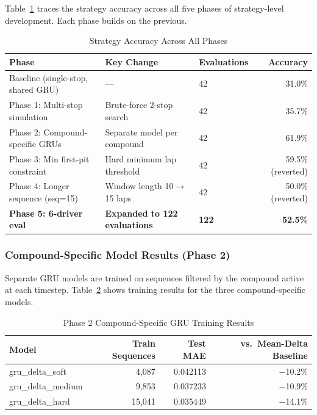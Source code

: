 \documentclass[12pt]{article}
\begin{document}
Table~\ref{tab:strategy} traces the strategy accuracy across all five phases of strategy-level development. Each phase builds on the previous.

\begin{table}[h]
\centering
\caption{Strategy Accuracy Across All Phases}
\label{tab:strategy}
\begin{tabular}{lllr}
\toprule
Phase & Key Change & Evaluations & Accuracy \\
\midrule
Baseline (single-stop, shared GRU) & — & 42 & 31.0\% \\
Phase 1: Multi-stop simulation & Brute-force 2-stop search & 42 & 35.7\% \\
Phase 2: Compound-specific GRUs & Separate model per compound & 42 & 61.9\% \\
Phase 3: Min first-pit constraint & Hard minimum lap threshold & 42 & 59.5\% (reverted) \\
Phase 4: Longer sequence (seq=15) & Window length 10$\to$15 laps & 42 & 50.0\% (reverted) \\
\textbf{Phase 5: 6-driver eval} & \textbf{Expanded to 122 evaluations} & \textbf{122} & \textbf{52.5\%} \\
\bottomrule
\end{tabular}
\end{table}

\subsubsection{Compound-Specific Model Results (Phase 2)}

Separate GRU models are trained on sequences filtered by the compound active at each timestep. Table~\ref{tab:compound} shows training results for the three compound-specific models.

\begin{table}[h]
\centering
\caption{Phase 2 Compound-Specific GRU Training Results}
\label{tab:compound}
\begin{tabular}{lrrr}
\toprule
Model & Train Sequences & Test MAE & vs.\ Mean-Delta Baseline \\
\midrule
gru\_delta\_soft   & 4,087  & 0.042113 & $-$10.2\% \\
gru\_delta\_medium & 9,853  & 0.037233 & $-$10.9\% \\
gru\_delta\_hard   & 15,041 & 0.035449 & $-$14.1\% \\
\bottomrule
\end{tabular}
\end{table}
\end{document}
